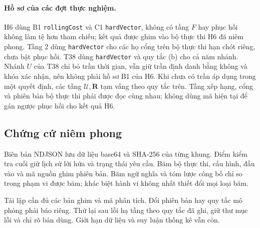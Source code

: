 \paragraph{Hồ sơ của các đợt thực nghiệm.}
H6 dùng B1 \texttt{rollingCost} và C1 \texttt{hardVector}, không có tầng $F$ hay phục hồi
không làm tệ hơn tham chiếu; kết quả được ghim vào bộ thực thi H6 đã niêm phong. Tầng 2 dùng
\texttt{hardVector} cho các họ cổng trên bộ thực thi hạn chót riêng, chưa bật phục hồi.
T38 dùng \texttt{hardVector} và quy tắc (b) cho cả năm nhánh. Nhánh $U$ của T38 chỉ bỏ
trần thời gian, vẫn giữ trần định danh bằng không và khóa xác nhận, nên không phải
hồ sơ B1 của H6. Khi chưa có trần áp dụng trong một quyết định, các tầng $\mathcal{U},\mathbf{R}$
tạm vắng theo quy tắc trên. Tầng xếp hạng, cổng và phiên bản bộ thực thi phải được
đọc cùng nhau; không dùng mã hiện tại để gán ngược phục hồi cho kết quả H6.

\subsection{Chứng cứ niêm phong}

Biên bản NDJSON lưu dữ liệu base64 và SHA-256 của từng khung. Điểm kiểm tra cuối giữ
lịch sử lời hứa và trạng thái yêu cầu. Băm bộ thực thi, cấu hình, đầu vào và mã nguồn ghim
phiên bản. Băm ngữ nghĩa và tóm lược công bố chỉ so trong phạm vi được băm; khác biệt
hành vi không nhất thiết đổi mọi loại băm.

Tái lập cần đủ các bản ghim và mã phân tích. Đổi phiên bản hay quy tắc mô phỏng phải
báo riêng. Thử lại sau lỗi hạ tầng theo quy tắc đã ghi, giữ thư mục lỗi và chỉ rõ bản dùng.
Giới hạn dữ liệu và suy luận thống kê vẫn còn.

